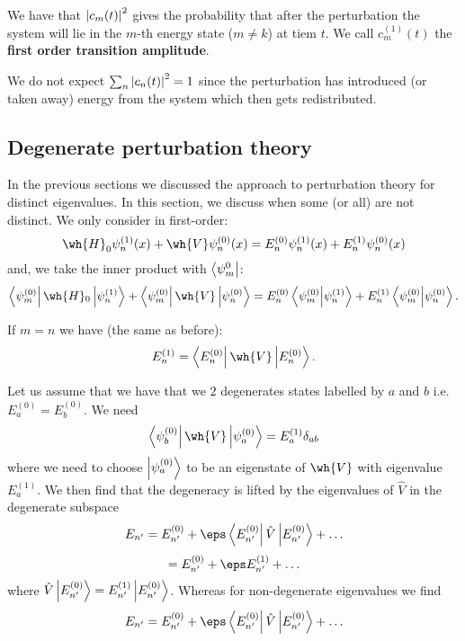 \documentclass[12pt, a4paper]{article}
\begin{document}
\begin{mdprop}
    We have that \(\abs{c_m(t)}^2\) gives the probability that after the perturbation the system will lie in the \(m\)-th energy state (\(m\neq k\)) at tiem \(t\). We call \(c_m^{(1)}(t)\) the \textbf{first order transition amplitude}.
\end{mdprop}

\begin{mdremark}
    We do not expect \(\sum_n \abs{c_n(t)}^2=1\) since the perturbation has introduced (or taken away) energy from the system which then gets redistributed.
\end{mdremark}

\subsection{Degenerate perturbation theory}

In the previous sections we discussed the approach to perturbation theory for distinct eigenvalues. In this section, we discuss when some (or all) are not distinct.
We only consider in first-order:
\[\wh{H}_0 \psi_n^{(1)}(x) + \wh{V} \psi_n^{(0)}(x) = E_n^{(0)} \psi_n^{(1)}(x) + E_n^{(1)} \psi_n^{(0)}(x)\]
and, we take the inner product with \(\bra{\psi_m^{0}}\):
\[\bra{\psi_m^{(0)}} \wh{H}_0\ket{\psi_n^{(1)}}+\bra{\psi_m^{(0)}} \wh{V}\ket{\psi_n^{(0)}}=E_n^{(0)}\bra{\psi_m^{(0)}}\ket{\psi_n^{(1)}}+E_n^{(1)}\bra{\psi_m^{(0)}}\ket{\psi_n^{(0)}}.\]

\begin{proposition}
    If \(m=n\) we have (the same as before):
    \[E_n^{(1)} = \bra{E_n^{(0)}}\wh{V}\ket{E_n^{(0)}}.\]
\end{proposition}

\noindent Let us assume that we have that we \(2\) degenerates states labelled by \(a\) and \(b\) i.e. \(E_a^{(0)} = E_b^{(0)}\). We need 
\[\bra{\psi_b^{(0)}} \wh{V} \ket{\psi_a^{(0)}} = E_a^{(1)} \delta_{ab}\]
where we need to choose \(\ket{\psi_a^{(0)}}\) to be an eigenstate of \(\wh{V}\) with eigenvalue \(E_a^{(1)}\). We then find that the degeneracy is lifted by the eigenvalues of \(\hat{V}\) in the degenerate subspace
\[ E_{n'} = E_{n'}^{(0)} + \eps \bra{E_{n'}^{(0)}}\hat{V}\ket{E_{n'}^{(0)}} + \ldots \]
\[ = E_{n'}^{(0)} + \eps E_{n'}^{(1)} + \ldots \]
where \(\hat{V}\ket{E_{n'}^{(0)}} = E_{n'}^{(1)}\ket{E_{n'}^{(0)}}\). Whereas for non-degenerate eigenvalues we find
\[ E_{n'} = E_{n'}^{(0)} + \eps \bra{E_{n'}^{(0)}}\hat{V}\ket{E_{n'}^{(0)}} + \ldots \]
\end{document}
